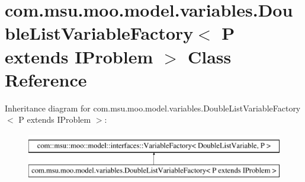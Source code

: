 \hypertarget{classcom_1_1msu_1_1moo_1_1model_1_1variables_1_1DoubleListVariableFactory_3_01P_01extends_01IProblem_01_4}{\section{com.\-msu.\-moo.\-model.\-variables.\-Double\-List\-Variable\-Factory$<$ P extends I\-Problem $>$ Class Reference}
\label{classcom_1_1msu_1_1moo_1_1model_1_1variables_1_1DoubleListVariableFactory_3_01P_01extends_01IProblem_01_4}
}
Inheritance diagram for com.\-msu.\-moo.\-model.\-variables.\-Double\-List\-Variable\-Factory$<$ P extends I\-Problem $>$\-:\begin{figure}[H]
\begin{center}
\leavevmode
\includegraphics[height=2.000000cm]{classcom_1_1msu_1_1moo_1_1model_1_1variables_1_1DoubleListVariableFactory_3_01P_01extends_01IProblem_01_4}
\end{center}
\end{figure}
